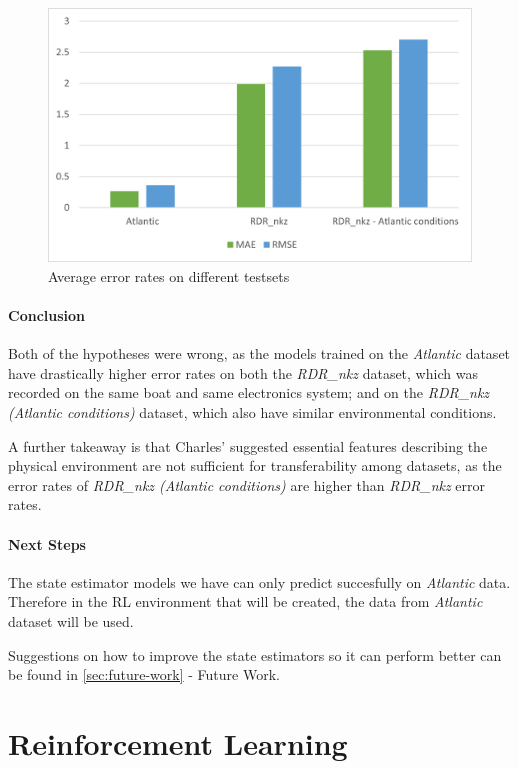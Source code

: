 \documentclass[12pt,twoside]{report}
\begin{document}
\begin{figure}[htbp]
\centering
\includegraphics[width = \hsize]{figures/transferability/transferability chart.png}
\caption{Average error rates on different testsets}
\label{fig:transferability-avg-chart}
\end{figure}

\subsubsection{Conclusion}
Both of the hypotheses were wrong, as the models trained on the \textit{Atlantic} dataset have drastically higher error rates on both the \textit{RDR\_nkz} dataset, which was recorded on the same boat and same electronics system; and on the \textit{RDR\_nkz (Atlantic conditions)} dataset, which also have similar environmental conditions.

A further takeaway is that Charles' suggested essential features describing the physical environment are not sufficient for transferability among datasets, as the error rates of \textit{RDR\_nkz (Atlantic conditions)} are higher than \textit{RDR\_nkz} error rates.

\subsubsection{Next Steps}
The state estimator models we have can only predict succesfully on \textit{Atlantic} data. Therefore in the RL environment that will be created, the data from \textit{Atlantic} dataset will be used.

Suggestions on how to improve the state estimators so it can perform better can be found in \ref{sec:future-work} - Future Work.

\chapter{Reinforcement Learning}
\end{document}
